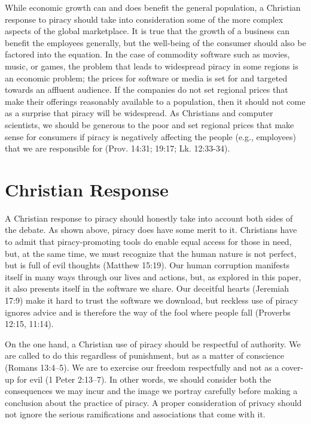 \documentclass[onecolumn, 12pt]{article}
\begin{document}
While economic growth can and does benefit the general population, a Christian
response to piracy should take into consideration some of the more complex
aspects of the global marketplace. It is true that the growth of a business can
benefit the employees generally, but the well-being of the consumer should also
be factored into the equation. In the case of commodity software such as
movies, music, or games, the problem that leads to widespread piracy in some
regions is an economic problem; the prices for software or media is set for and
targeted towards an affluent audience. If the companies do not set regional
prices that make their offerings reasonably available to a population, then it
should not come as a surprise that piracy will be widespread. As Christians and
computer scientists, we should be generous to the poor and set regional prices
that make sense for consumers if piracy is negatively affecting the people
(e.g., employees) that we are responsible for (Prov. 14:31; 19:17; Lk. 12:33-34).

\section{Christian Response}
A Christian response to piracy should honestly take into account both sides of
the debate. As shown above, piracy does have some merit to it. Christians have
to admit that piracy-promoting tools do enable equal access for those in need,
but, at the same time, we must recognize that the human nature is not perfect,
but is full of evil thoughts (Matthew 15:19). Our human corruption manifests
itself in many ways through our lives and actions, but, as explored in this
paper, it also presents itself in the software we share. Our deceitful hearts
(Jeremiah 17:9) make it hard to trust the software we download, but reckless
use of piracy ignores advice and is therefore the way of the fool where people
fall (Proverbs 12:15, 11:14).

On the one hand, a Christian use of piracy should be respectful of authority.
We are called to do this regardless of punishment, but as a matter of
conscience (Romans 13:4--5). We are to exercise our freedom respectfully and
not as a cover-up for evil (1 Peter 2:13--7). In other words, we should consider
both the consequences we may incur and the image we portray carefully before
making a conclusion about the practice of piracy. A proper consideration of
privacy should not ignore the serious ramifications and associations that come
with it.
\end{document}
